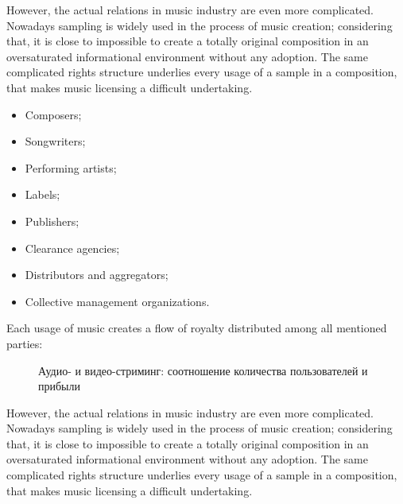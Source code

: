 \documentclass[12pt]{report}
\begin{document}
However, the actual relations in music industry are even more complicated. Nowadays sampling is widely used in the process of music creation; considering that, it is close to impossible to create a totally original composition in an oversaturated informational environment without any adoption. The same complicated rights structure underlies every usage of a sample in a composition, that makes music licensing a difficult undertaking.

\begin{itemize}
	\item Composers;
	\item Songwriters;
	\item Performing artists;
	\item Labels;
	\item Publishers;
	\item Clearance agencies;
	\item Distributors and aggregators;
	\item Collective management organizations.
\end{itemize}
	
Each usage of music creates a flow of royalty distributed among all mentioned parties:

\begin{figure}[H]
\centering
\caption{Аудио- и видео-стриминг: соотношение количества пользователей и прибыли}
\vspace{20pt}
\userRevenue
{}
\end{figure}	

However, the actual relations in music industry are even more complicated. Nowadays sampling is widely used in the process of music creation; considering that, it is close to impossible to create a totally original composition in an oversaturated informational environment without any adoption. The same complicated rights structure underlies every usage of a sample in a composition, that makes music licensing a difficult undertaking.
\end{document}
